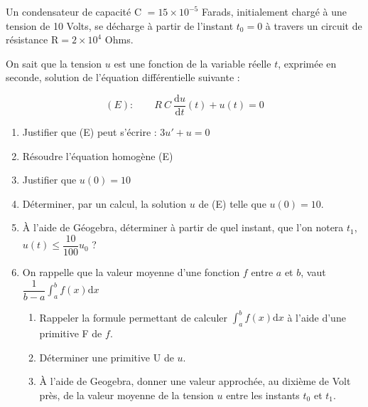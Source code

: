 \begin{exercice_cours}[\quad]{}

	Un condensateur de capacité C $= 15\times10^{-5}$ Farads, initialement chargé à une tension de 10 Volts, se décharge à partir de l'instant $t_0=0$ à travers un circuit de résistance R$ = 2\times10^4$ Ohms. 

    

On sait que la tension $u$ est une fonction de la variable réelle $t$, exprimée en seconde, solution de l'équation différentielle suivante :

\[(E) : \qquad R~C~\dfrac{\text{d}u}{\text{d}t}(t)+u(t)=0\]



\begin{enumerate}
	\item Justifier que (E) peut s'écrire : $3u'+u=0$  \hfill\reponseLigne[7cm]{}  
	\item Résoudre l'équation homogène (E) \hfill\reponseLigne[7cm]{}
	\item Justifier que $u(0)=10$    \hfill\reponseLigne[7cm]{}
	\item Déterminer, par un calcul, la solution $u$ de (E) telle que $u(0)=10$.    
		\begin{blocvisiblex}[height=2]
{\quad}

\end{blocvisiblex}
	\item À l'aide de Géogebra, déterminer à partir de quel instant, que l'on notera $t_1$, $u(t)\leq \dfrac{10}{100}u_0$ ?
	\hfill\reponseLigne[7cm]{}
	    
	
	    
	\item On rappelle que la valeur moyenne d'une fonction $f$ entre $a$ et $b$, vaut ${\dfrac{1}{b-a}\int_a^bf(x)\text{d}x}$
	\begin{enumerate}
		\item Rappeler la formule permettant de calculer $ {\int_a^bf(x)\text{d}x}$ à l'aide d'une primitive F de $f$.     
		
		\hfill\reponseLigne[7cm]{}
		\item Déterminer une primitive U de $u$.   \hfill\reponseLigne[7cm]{} 
		\item À l'aide de Geogebra, donner une valeur approchée, au dixième de Volt près, de la valeur moyenne de la tension $u$ entre les instants $t_0$ et $t_1$.    
		
		\hfill\reponseLigne[7cm]{}
	\end{enumerate}
\end{enumerate}
\end{exercice_cours}
